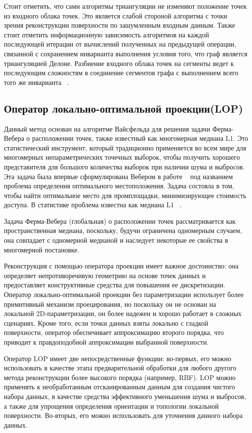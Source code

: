 Стоит отметить, что сами алгоритмы триангуляции не изменяют положение точек из входного облака точек. Это является слабой стороной алгоритма с точки зрения реконструкции поверхности по зашумленным входным данным. Также стоит отметить информационную зависимость алгоритмов на каждой последующей итерации от вычислений полученных на предыдущей операции, связанной с сохранением инварианта выполнения условия того, что граф является триангуляцией Делоне. Разбиение входного облака точек на сегменты ведет к последующим сложностям в соединение сегментов графа с выполнением всего того же инварианта ~\cite{Tamal}.
\subsection{Оператор локально-оптимальной проекции(LOP)}
Данный метод основан на алгоритме Вайсфельда для решения задачи Ферма-Вебера о расположении точек, также известный как многомерная медиана L1. Это статистический инструмент, который традиционно применяется во всем мире для многомерных непараметрических точечных выборок, чтобы получить хорошего представителя для большого количества выборок при наличии шума и выбросов. Эта задача была впервые сформулирована Вебером в работе ~\cite{WEBER}  под названием проблема определения оптимального местоположения. Задача состояла в том, чтобы найти оптимальное место для промплощадки, минимизирующее стоимость доступа. В статистике проблема известна как медиана L1 ~\cite{BROWN, SMALL}.

Задача Ферма-Вебера (глобальная) о расположении точек рассматривается как пространственная медиана, поскольку, будучи ограничена одномерным случаем, она совпадает с одномерной медианой и наследует некоторые ее свойства в многомерной постановке.

Реконструкция с помощью оператора проекции имеет важное достоинство: она определяет непротиворечивую геометрию на основе точек данных и предоставляет конструктивные средства для повышения ее дискретизации. 
Оператор локально-оптимальной проекции без параметризации использует более примитивный механизм проецирования, но поскольку он не основан на локальной 2D-параметризации, он более надежен и хорошо работает в сложных сценариях. Кроме того, если точки данных взяты локально с гладкой поверхности, оператор обеспечивает аппроксимацию второго порядка, что приводит к правдоподобной аппроксимации выбранной поверхности.

Оператор LOP имеет две непосредственные функции: во-первых, его можно использовать в качестве этапа предварительной обработки для любого другого метода реконструкции более высокого порядка (например, RBF). LOP можно применять к необработанным отсканированным данным для создания чистого набора данных, в качестве средства эффективного уменьшения шума и выбросов, а также для упрощения определения ориентации и топологии локальной поверхности. Во-вторых, его можно использовать для уточнения данного набора данных.

